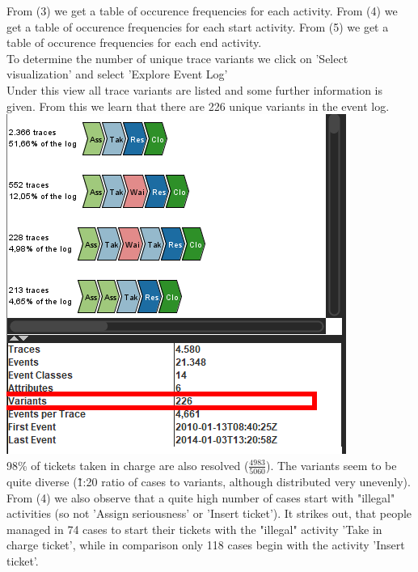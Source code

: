 \documentclass[../../main.tex]{subfiles}
\begin{document}
From (3) we get a table of occurence frequencies for each activity. From (4) we get a table of occurence frequencies for each start activity. From (5) we get a table of occurence frequencies for each end activity.\\
To determine the number of unique trace variants we click on 'Select visualization' and select 'Explore Event Log'\\
Under this view all trace variants are listed and some further information is given. From this we learn that there are 226 unique variants in the event log.\\
\includegraphics[width=0.5\columnwidth]{img/ProM_a_traces.png}\\

98\% of tickets taken in charge are also resolved ($\frac{4983}{5060}$).
The variants seem to be quite diverse (\~1:20 ratio of cases to variants, although distributed very unevenly). \\
From (4) we also observe that a quite high number of cases start with "illegal" activities (so not 'Assign seriousness' or 'Insert ticket'). It strikes out, that people managed in 74 cases to start their tickets with the "illegal" activity 'Take in charge ticket', while in comparison only 118 cases begin with the activity 'Insert ticket'.
\end{document}
